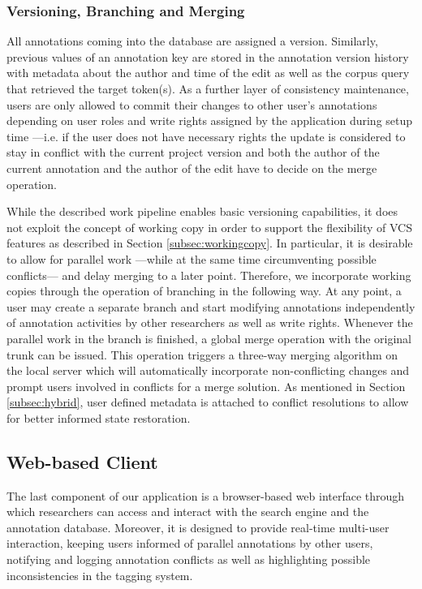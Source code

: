 \documentclass{sig-alternate}
\begin{document}
\subsubsection{Versioning, Branching and Merging}\label{subsec:dbversion}

All annotations coming into the database are assigned a version. Similarly, previous values
of an annotation key are stored in the annotation version history with metadata about the author
and time of the edit as well as the corpus query that retrieved the target token(s).
As a further layer of consistency maintenance, users are only allowed to commit their changes
to other user's annotations depending on user roles and write rights assigned by the application
during setup time ---i.e. if the user does not have necessary rights the update is
considered to stay in conflict with the current project version and both the author of the
current annotation and the author of the edit have to decide on the merge operation.

While the described work pipeline enables basic versioning capabilities, it does not exploit
the concept of working copy in order to support the flexibility of VCS features as described in
Section \ref{subsec:workingcopy}. In particular, it is desirable to allow for parallel
work ---while at the same time circumventing possible conflicts--- and delay merging to a later
point. 
Therefore, we incorporate working copies through the operation of branching in the following way.
At any point, a user may create a separate branch and start modifying annotations independently of
annotation activities by other researchers as well as write rights. Whenever the parallel work in
the branch is finished, a global merge operation with the original trunk can be issued.
This operation triggers a three-way merging algorithm on the local server which will
automatically incorporate non-conflicting changes and prompt users involved in conflicts for
a merge solution. As mentioned in Section \ref{subsec:hybrid}, user defined metadata is attached
to conflict resolutions to allow for better informed state restoration.

\subsection{Web-based Client}\label{subsec:client}

The last component of our application is a browser-based web interface through which researchers
can access and interact with the search engine and the annotation database.
Moreover, it is designed to provide real-time multi-user interaction, keeping users informed of
parallel annotations by other users, notifying and logging annotation conflicts as well as
highlighting possible inconsistencies in the tagging system.
\end{document}
